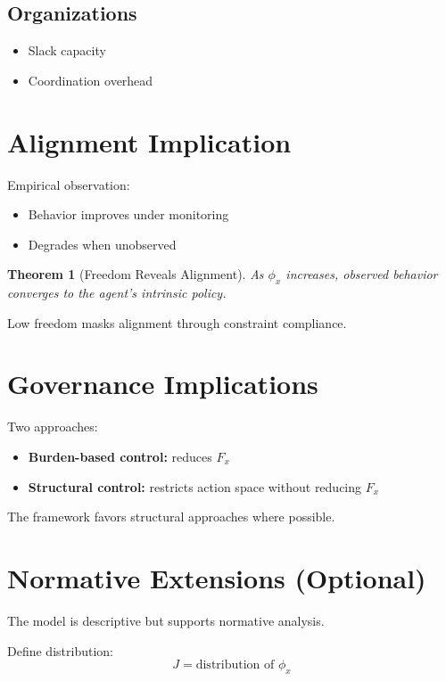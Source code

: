 \documentclass[11pt]{article}
\newtheorem{theorem}{Theorem}
\begin{document}
\subsection{Organizations}
\begin{itemize}
\item Slack capacity
\item Coordination overhead
\end{itemize}

\section{Alignment Implication}

Empirical observation:

\begin{itemize}
\item Behavior improves under monitoring
\item Degrades when unobserved
\end{itemize}

\begin{theorem}[Freedom Reveals Alignment]
As $\phi_x$ increases, observed behavior converges to the agent's intrinsic policy.
\end{theorem}

Low freedom masks alignment through constraint compliance.

\section{Governance Implications}

Two approaches:

\begin{itemize}
\item \textbf{Burden-based control:} reduces $F_x$
\item \textbf{Structural control:} restricts action space without reducing $F_x$
\end{itemize}

The framework favors structural approaches where possible.

\section{Normative Extensions (Optional)}

The model is descriptive but supports normative analysis.

Define distribution:
\[
J = \text{distribution of } \phi_x
\]
\end{document}
